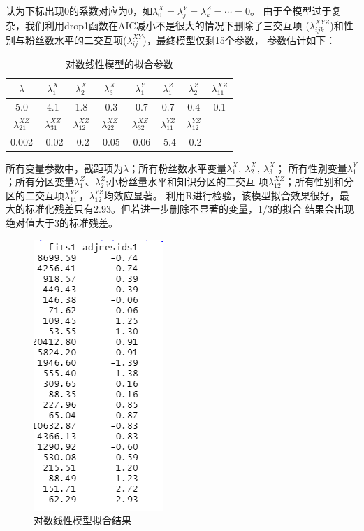\documentclass{ctexart}
\begin{document}
认为下标出现$0$的系数对应为$0$，如$\lambda_0^X=\lambda_j^Y=\lambda_k^Z=\cdots=0$。
由于全模型过于复杂，我们利用drop1函数在AIC减小不是很大的情况下删除了三交互项
($\lambda_{ijk}^{XYZ}$)和性别与粉丝数水平的二交互项($\lambda_{ij}^{XY}$)，最终模型仅剩15个参数，
参数估计如下：
\begin{table}[H]
    \centering
    \begin{tabular}{cccccccc}
        \toprule
        $\lambda$ & $\lambda_1^X$ & $\lambda_2^X$ & $\lambda_3^X$ & $\lambda_1^Y$ 
        & $\lambda_1^Z$ & $\lambda_2^Z$ & $\lambda_{11}^{XZ}$ \\
        \midrule
        5.0 & 4.1 & 1.8 & -0.3 & -0.7 & 0.7 & 0.4 & 0.1\\
        \midrule  
        $\lambda_{21}^{XZ}$ & $\lambda_{31}^{XZ}$ & $\lambda_{12}^{XZ}$ & $\lambda_{22}^{XZ}$ & 
        $\lambda_{32}^{XZ}$ & $\lambda_{11}^{YZ}$ & $\lambda_{12}^{YZ}$ & \\
        \midrule
        0.002 & -0.02 & -0.2 & -0.05 & -0.06 & -5.4 & -0.2 & \\
        \bottomrule
    \end{tabular}
    \caption{对数线性模型的拟合参数}
\end{table}


所有变量参数中，截距项为$\lambda$；所有粉丝数水平变量$\lambda_1^X,\ \lambda_2^X,\ \lambda_3^X$；
所有性别变量$\lambda_1^Y$；所有分区变量$\lambda_1^Z、\lambda_2^Z$;小粉丝量水平和知识分区的二交互
项$\lambda_{12}^{XZ}$；所有性别和分区的二交互项$\lambda_{11}^{YZ}$，$\lambda_{12}^{YZ}$均效应显著。
利用R进行检验，该模型拟合效果很好，最大的标准化残差只有$2.93$。但若进一步删除不显著的变量，1/3的拟合
结果会出现绝对值大于3的标准残差。

\begin{figure}[H]
    \centering
    \includegraphics[]{LLM/LLM_fit.png}
    \caption{对数线性模型拟合结果}
\end{figure}
\end{document}
